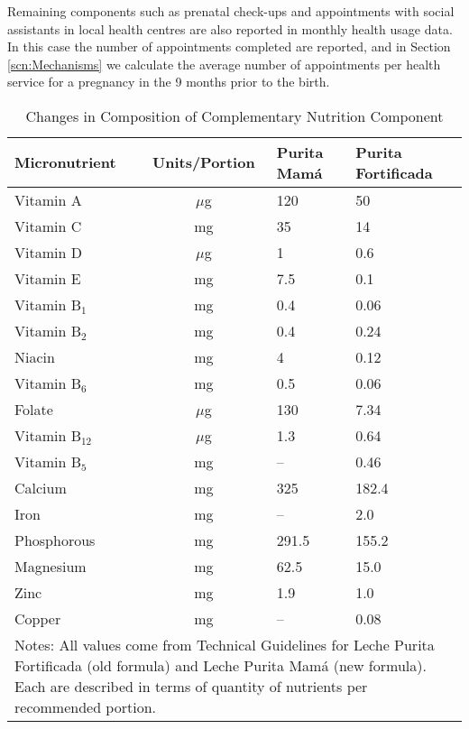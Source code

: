 \documentclass[12pt]{article}
\begin{document}
\begin{spacing}{1.4}
Remaining components such as prenatal check-ups and appointments
with social assistants in local health centres are also reported
in monthly health usage data.  In this case the number of
appointments completed are reported, and in Section \ref{scn:Mechanisms}
we calculate the average number of appointments per health service
for a pregnancy in the 9 months prior to the birth.

\begin{table}[htpb]
  \caption{Changes in Composition of Complementary Nutrition Component}
  \label{lechepurita}
  \begin{tabular}{lcll} \toprule
    Micronutrient & Units/Portion & Purita Mam\'a&Purita Fortificada \\ \midrule
    Vitamin A & $\mu$g &120&50\\
    Vitamin C & mg     &35&14\\
    Vitamin D & $\mu$g &1&0.6\\
    Vitamin E & mg     &7.5&0.1\\
    Vitamin B$_1$ & mg &0.4&0.06\\
    Vitamin B$_2$ & mg &0.4&0.24\\
    Niacin & mg        &4&0.12\\
    Vitamin B$_6$ & mg &0.5&0.06\\
    Folate  &  $\mu$g  &130 &7.34\\
    Vitamin B$_{12}$   & $\mu$g&1.3&0.64\\
    Vitamin B$_{5}$    & mg& --&0.46\\
    Calcium  &mg       &325&182.4\\
    Iron  &mg          &--&2.0\\
    Phosphorous  &mg  &291.5&155.2\\
    Magnesium &mg      &62.5&15.0\\
    Zinc &mg           &1.9&1.0\\ 
    Copper &mg         &--&0.08\\ \bottomrule
    \multicolumn{4}{p{11cm}}{{\footnotesize Notes: All values come from Technical
        Guidelines for Leche Purita Fortificada (old formula) and Leche Purita Mam\'a
        (new formula).  Each are described in terms of quantity of nutrients per
        recommended portion.}}
  \end{tabular}
\end{table}


\setcounter{table}{0}
\renewcommand{\thetable}{C\arabic{table}}
\setcounter{figure}{0}
\renewcommand{\thefigure}{C\arabic{figure}}

\end{spacing}
\end{document}
